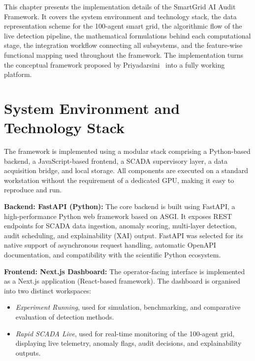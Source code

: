 This chapter presents the implementation details of the SmartGrid AI Audit Framework. It covers the system environment and technology stack, the data representation scheme for the 100-agent smart grid, the algorithmic flow of the live detection pipeline, the mathematical formulations behind each computational stage, the integration workflow connecting all subsystems, and the feature-wise functional mapping used throughout the framework. The implementation turns the conceptual framework proposed by Priyadarsini~\cite{priyadarsini2025} into a fully working platform.

\section{System Environment and Technology Stack}
\label{sec:tech_stack}

The framework is implemented using a modular stack comprising a Python-based backend, a JavaScript-based frontend, a SCADA supervisory layer, a data acquisition bridge, and local storage. All components are executed on a standard workstation without the requirement of a dedicated GPU, making it easy to reproduce and run.

\par \vspace{0.35cm}
\noindent
\textbf{Backend: FastAPI (Python):} The core backend is built using FastAPI, a high-performance Python web framework based on ASGI. It exposes REST endpoints for SCADA data ingestion, anomaly scoring, multi-layer detection, audit scheduling, and explainability (XAI) output. FastAPI was selected for its native support of asynchronous request handling, automatic OpenAPI documentation, and compatibility with the scientific Python ecosystem.

\par \vspace{0.35cm}
\noindent
\textbf{Frontend: Next.js Dashboard:} The operator-facing interface is implemented as a Next.js application (React-based framework). The dashboard is organised into two distinct workspaces:
\begin{itemize}
    \item \textit{Experiment Running}, used for simulation, benchmarking, and comparative evaluation of detection methods.
    \item \textit{Rapid SCADA Live}, used for real-time monitoring of the 100-agent grid, displaying live telemetry, anomaly flags, audit decisions, and explainability outputs.
\end{itemize}


